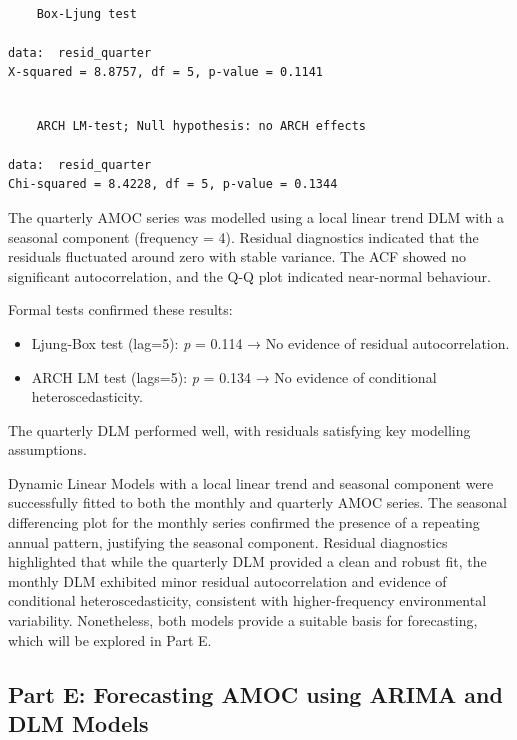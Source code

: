 \documentclass[
  11pt,
]{article}
\begin{document}
\begin{verbatim}

    Box-Ljung test

data:  resid_quarter
X-squared = 8.8757, df = 5, p-value = 0.1141
\end{verbatim}

\begin{verbatim}

    ARCH LM-test; Null hypothesis: no ARCH effects

data:  resid_quarter
Chi-squared = 8.4228, df = 5, p-value = 0.1344
\end{verbatim}

The quarterly AMOC series was modelled using a local linear trend DLM
with a seasonal component (frequency = 4). Residual diagnostics
indicated that the residuals fluctuated around zero with stable
variance. The ACF showed no significant autocorrelation, and the Q-Q
plot indicated near-normal behaviour.

Formal tests confirmed these results:

\begin{itemize}
\item
  Ljung-Box test (lag=5): \emph{p} = 0.114 → No evidence of residual
  autocorrelation.
\item
  ARCH LM test (lags=5): \emph{p} = 0.134 → No evidence of conditional
  heteroscedasticity.
\end{itemize}

The quarterly DLM performed well, with residuals satisfying key
modelling assumptions.

Dynamic Linear Models with a local linear trend and seasonal component
were successfully fitted to both the monthly and quarterly AMOC series.
The seasonal differencing plot for the monthly series confirmed the
presence of a repeating annual pattern, justifying the seasonal
component. Residual diagnostics highlighted that while the quarterly DLM
provided a clean and robust fit, the monthly DLM exhibited minor
residual autocorrelation and evidence of conditional heteroscedasticity,
consistent with higher-frequency environmental variability. Nonetheless,
both models provide a suitable basis for forecasting, which will be
explored in Part E.

\subsection{Part E: Forecasting AMOC using ARIMA and DLM
Models}\label{part-e-forecasting-amoc-using-arima-and-dlm-models}
\end{document}
